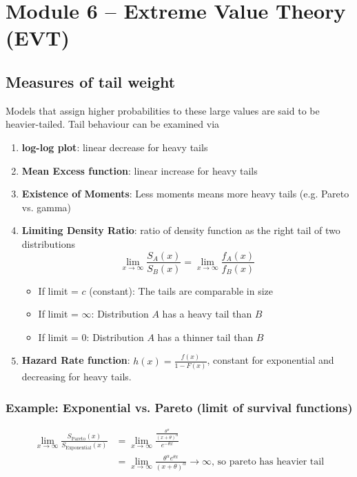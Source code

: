 \documentclass[11pt]{article}
\newcommand{\noi}{\noindent}
\begin{document}
\newpage
\section{Module 6 – Extreme Value Theory (EVT)}
\subsection{Measures of tail weight}
\noi Models that assign higher probabilities to these large values are said to be heavier-tailed. Tail behaviour can be examined via
\begin{enumerate}
    \item \textbf{log-log plot}: linear decrease for heavy tails
    \item \textbf{Mean Excess function}: linear increase for heavy tails
    \item \textbf{Existence of Moments}: Less moments means more heavy tails (e.g. Pareto vs. gamma)
    \item \textbf{Limiting Density Ratio}: ratio of density function as the right tail of two distributions
        $$\lim_{x \rightarrow \infty}{\frac{S_A(x)}{S_B(x)}} = \lim_{x\rightarrow\infty}{\frac{f_A(x)}{f_B(x)}}$$
        \begin{itemize}
            \item If limit = $c$ (constant): The tails are comparable in size
            \item If limit = $\infty$: Distribution $A$ has a heavy tail than $B$
            \item If limit = $0$: Distribution $A$ has a thinner tail than $B$
        \end{itemize}
    \item \textbf{Hazard Rate function}: $h(x) = \frac{f(x)}{1-F(x)}$, constant for exponential and decreasing for heavy tails.
\end{enumerate}

\subsubsection*{Example: Exponential vs. Pareto (limit of survival functions)}
\begin{align*}
    \lim_{x \rightarrow \infty}{\frac{S_{\text{Pareto}}(x)}{S_{\text{Exponential}}(x)}} &= \lim_{x\rightarrow\infty}\frac{\frac{\theta^\alpha}{(x+\theta)^\alpha}}{e^{-\theta x}} \\
    &= \lim_{x\rightarrow\infty}\frac{\theta^\alpha e^{\theta x}}{(x+\theta)^\alpha} \rightarrow \infty \text{, so pareto has heavier tail}
\end{align*}
\end{document}
